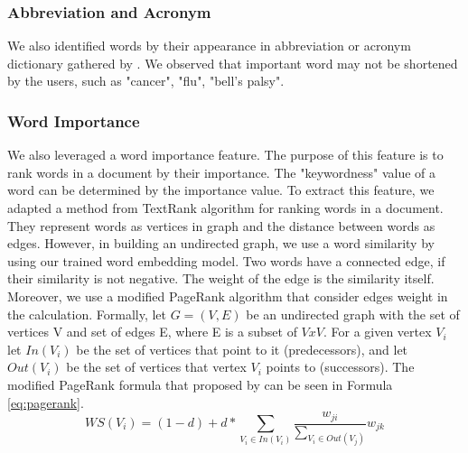 \subsubsection{Abbreviation and Acronym\\}
We also identified words by their appearance in abbreviation or acronym dictionary gathered by \cite{skripsiKakAbid}. We observed that important word may not be shortened by the users, such as "cancer", "flu", "bell’s palsy".

\subsubsection{Word Importance\\}
We also leveraged a word importance feature. The purpose of this feature is to rank words in a document by their importance. The "keywordness" value of a word can be determined by the importance value. To extract this feature, we adapted a method from TextRank \cite{mihalcea2004textrank} algorithm for ranking words in a document. They represent words as vertices in graph and the distance between words as edges. However, in building an undirected graph, we use a word similarity by using our trained word embedding model. Two words have a connected edge, if their similarity is not negative. The weight of the edge is the similarity itself. Moreover, we use a modified PageRank \cite{page1999pagerank} algorithm that consider edges weight in the calculation. Formally, let $G = (V, E)$ be an undirected graph with the set of vertices V and set of edges E, where E is a subset of $VxV$. For a given vertex $V_i$ let $In(V_i)$ be the set of vertices that point to it (predecessors), and let $Out(V_i)$ be the set of vertices that vertex $V_i$ points to (successors). The modified PageRank formula that proposed by \cite{mihalcea2004textrank} can be seen in Formula \ref{eq:pagerank}.
\begin{equation}\label{eq:pagerank}
	WS(V_{i})=(1-d) + d * \sum_{V_{i} \in In(V_{i})} \frac{w_{ji}}{\sum_{V_{i} \in Out(V_{j})}}w_{jk}
\end{equation}

